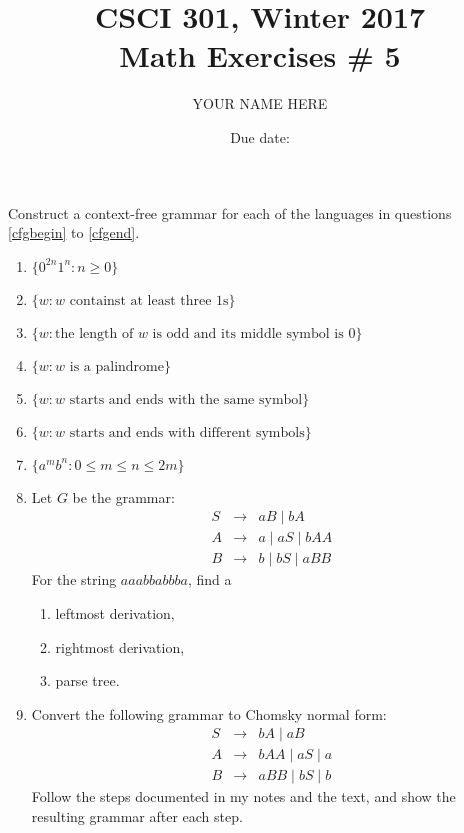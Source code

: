 \documentclass{article}
\title{CSCI 301, Winter 2017\\Math Exercises \# 5}
\author{YOUR NAME HERE}
\date{Due date: }
\begin{document}
\maketitle

Construct a context-free grammar for each of the languages
in questions \ref{cfgbegin} to \ref{cfgend}.
\begin{enumerate}
\item \label{cfgbegin}
$\{0^{2n}1^{n} : n \geq 0\}$

\item $\{w : w \mbox{ containst at least three 1s}\}$


\item $\{w : \mbox{the length of $w$ is odd and its middle symbol is 0}\}$

\item $\{w : w \mbox{ is a palindrome}\}$

\item $\{w : w \mbox{ starts and ends with the same symbol}\}$

\item  $\{w : w \mbox{ starts and ends with different symbols}\}$


\item \label{cfgend}
$\{a^mb^n : 0 \leq m \leq n \leq 2m\}$

\item Let $G$ be the grammar:
\begin{eqnarray*}
S &\rightarrow& aB \mid bA \\
A &\rightarrow& a \mid aS \mid bAA \\
B &\rightarrow& b \mid bS \mid aBB
\end{eqnarray*}
For the string $aaabbabbba$, find a

\begin{enumerate}
\item leftmost derivation,

\item rightmost derivation,

\item parse tree.

\end{enumerate}

\item Convert the following grammar to Chomsky normal form:
\begin{eqnarray*}
S &\rightarrow& bA \mid aB\\
A &\rightarrow& bAA \mid aS \mid a\\
B &\rightarrow& aBB \mid bS \mid b
\end{eqnarray*}
Follow the steps documented in my notes
and the text, and show the resulting grammar
after each step.


\end{enumerate}
\end{document}
